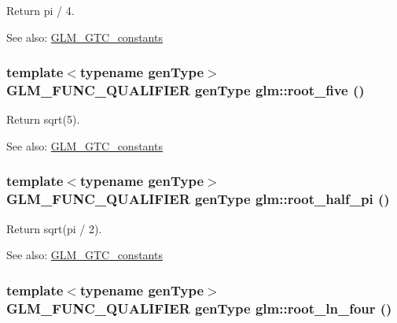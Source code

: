 Return pi / 4. \begin{Desc}
\item[See also:]\hyperlink{group__gtc__constants}{GLM\_\-GTC\_\-constants} \end{Desc}
\hypertarget{group__gtc__constants_gfa2f8c1bc0e6684652171820d9140d3e}{
\subsubsection[root\_\-five]{\setlength{\rightskip}{0pt plus 5cm}template$<$typename genType$>$ GLM\_\-FUNC\_\-QUALIFIER genType glm::root\_\-five ()}}
\label{group__gtc__constants_gfa2f8c1bc0e6684652171820d9140d3e}


Return sqrt(5). \begin{Desc}
\item[See also:]\hyperlink{group__gtc__constants}{GLM\_\-GTC\_\-constants} \end{Desc}
\hypertarget{group__gtc__constants_g39bda21134486f771067238aa263c562}{
\subsubsection[root\_\-half\_\-pi]{\setlength{\rightskip}{0pt plus 5cm}template$<$typename genType$>$ GLM\_\-FUNC\_\-QUALIFIER genType glm::root\_\-half\_\-pi ()}}
\label{group__gtc__constants_g39bda21134486f771067238aa263c562}


Return sqrt(pi / 2). \begin{Desc}
\item[See also:]\hyperlink{group__gtc__constants}{GLM\_\-GTC\_\-constants} \end{Desc}
\hypertarget{group__gtc__constants_g0f121de1b70ce7379c08f47291efdb49}{
\subsubsection[root\_\-ln\_\-four]{\setlength{\rightskip}{0pt plus 5cm}template$<$typename genType$>$ GLM\_\-FUNC\_\-QUALIFIER genType glm::root\_\-ln\_\-four ()}}
\label{group__gtc__constants_g0f121de1b70ce7379c08f47291efdb49}


